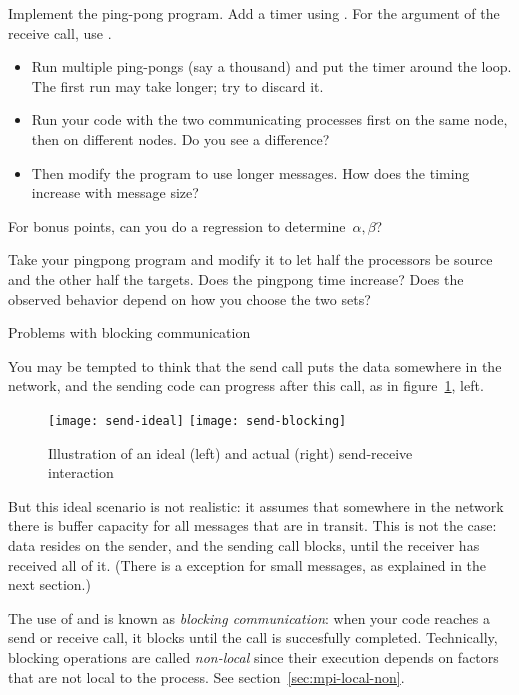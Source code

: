 \begin{exercise}
  \label{ex:pingpong}
  Implement the ping-pong program. Add a timer using .
  For the  argument of the receive call, use
  .

  \begin{itemize}
  \item Run multiple ping-pongs (say a thousand) and put the timer
    around the loop. The first run may take longer; try to discard it.
  \item Run your code with the two communicating processes first on
    the same node, then on different nodes. Do you see a difference?
  \item Then modify the program
    to use longer messages. How does the timing increase with message size?
  \end{itemize}
  For bonus points, can you do a regression to determine~$\alpha,\beta$?
\end{exercise}

\begin{exercise}
  \label{ex:hbwpingpong}
  Take your pingpong program and modify it 
  to let half the processors
  be source and the other half the targets. Does the pingpong time increase?
  Does the observed behavior depend on how you choose the two sets?
\end{exercise}

 {Problems with blocking communication}
\label{sec:blocking}

You may be tempted to think that the send call puts the data somewhere
in the network, and the sending code can progress after this call,
as in figure~\ref{fig:send-ideal}, left.
%
\begin{figure}[ht]
\leavevmode
\texttt{[image: send-ideal]}
\texttt{[image: send-blocking]}
\caption{Illustration of an ideal (left) and actual (right) send-receive interaction}
\label{fig:send-ideal}
\end{figure}
%
But this ideal scenario is not realistic: it assumes that somewhere
in the network there is buffer capacity for all messages that are in
transit.
This is not the case: data resides on the sender, and the sending call blocks,
until the receiver has received all of it. (There is a exception for
small messages, as explained in the next section.)

The use of  and 
is known as \emph{blocking communication}: when your code reaches a
send or receive call, it blocks until the call is succesfully completed.
Technically, blocking operations are called
\emph{non-local} since their execution
depends on factors that are not local to the process.
See section~\ref{sec:mpi-local-non}.

